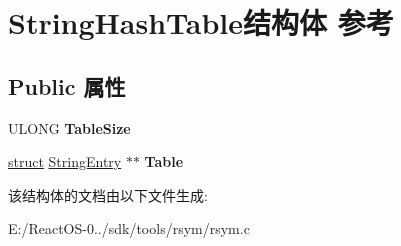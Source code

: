 \hypertarget{struct_string_hash_table}{}\section{String\+Hash\+Table结构体 参考}
\label{struct_string_hash_table}
\subsection*{Public 属性}
\begin{DoxyCompactItemize}
\item 
\mbox{\label{struct_string_hash_table_a27a7eb6d5e658836fc763182be218712}} 
U\+L\+O\+NG {\bfseries Table\+Size}
\item 
\mbox{\label{struct_string_hash_table_af4353483ff8d93a54130ad567f1cf5bc}} 
\hyperlink{interfacestruct}{struct} \hyperlink{struct_string_entry}{String\+Entry} $\ast$$\ast$ {\bfseries Table}
\end{DoxyCompactItemize}


该结构体的文档由以下文件生成\+:\begin{DoxyCompactItemize}
\item 
E\+:/\+React\+O\+S-\/0../sdk/tools/rsym/rsym.\+c\end{DoxyCompactItemize}
